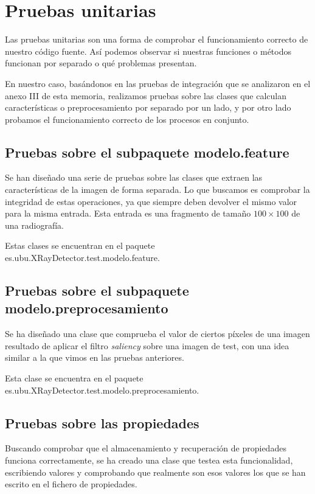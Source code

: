 \section{Pruebas unitarias}
Las pruebas unitarias son una forma de comprobar el funcionamiento correcto de nuestro código fuente. Así podemos observar si nuestras funciones o métodos funcionan por separado o qué problemas presentan.

En nuestro caso, basándonos en las pruebas de integración que se analizaron en el anexo III de esta memoria, realizamos pruebas sobre las clases que calculan características o preprocesamiento por separado por un lado, y por otro lado probamos el funcionamiento correcto de los procesos en conjunto.

\subsection{Pruebas sobre el subpaquete modelo.feature}
Se han diseñado una serie de pruebas sobre las clases que extraen las características de la imagen de forma separada. Lo que buscamos es comprobar la integridad de estas operaciones, ya que siempre deben devolver el mismo valor para la misma entrada. Esta entrada es una fragmento de tamaño $100\times100$ de una radiografía.

Estas clases se encuentran en el paquete es.ubu.XRayDetector.test.modelo.feature.

\subsection{Pruebas sobre el subpaquete modelo.preprocesamiento}
Se ha diseñado una clase que comprueba el valor de ciertos píxeles de una imagen resultado de aplicar el filtro \textit{saliency} sobre una imagen de test, con una idea similar a la que vimos en las pruebas anteriores.

Esta clase se encuentra en el paquete es.ubu.XRayDetector.test.modelo.preprocesamiento.

\subsection{Pruebas sobre las propiedades}
Buscando comprobar que el almacenamiento y recuperación de propiedades funciona correctamente, se ha creado una clase que testea esta funcionalidad, escribiendo valores y comprobando que realmente son esos valores los que se han escrito en el fichero de propiedades.

